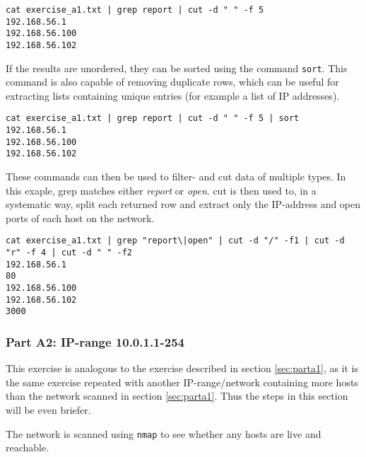 \begin{lstlisting}[numbers=none, language={}, frame=single, framexleftmargin={0.2em}]
cat exercise_a1.txt | grep report | cut -d " " -f 5
192.168.56.1
192.168.56.100
192.168.56.102
\end{lstlisting}

If the results are unordered, they can be sorted using the command
\texttt{sort}. This command is also capable of removing duplicate
rows, which can be useful for extracting lists containing unique
entries (for example a list of IP addresses).

\begin{lstlisting}[numbers=none, language={}, frame=single, framexleftmargin={0.2em}]
cat exercise_a1.txt | grep report | cut -d " " -f 5 | sort
192.168.56.1
192.168.56.100
192.168.56.102
\end{lstlisting}

These commands can then be used to filter- and cut data of multiple
types. In this exaple, grep matches either \textit{report} or \textit{open}.
cut is then used to, in a systematic way, split each returned row and extract
only the IP-address and open ports of each host on the network.

\begin{lstlisting}[numbers=none, language={}, frame=single, framexleftmargin={0.2em}]
cat exercise_a1.txt | grep "report\|open" | cut -d "/" -f1 | cut -d "r" -f 4 | cut -d " " -f2                                              
192.168.56.1
80
192.168.56.100
192.168.56.102
3000
\end{lstlisting}

\subsubsection{Part A2: IP-range 10.0.1.1-254}
This exercise is analogous to the exercise described in section \ref{sec:parta1},
as it is the same exercise repeated with another IP-range/network containing
more hosts than the network scanned in section \ref{sec:parta1}. Thus the steps in
this section will be even briefer.

The network is scanned using \texttt{nmap} to see whether any hosts are
live and reachable.

